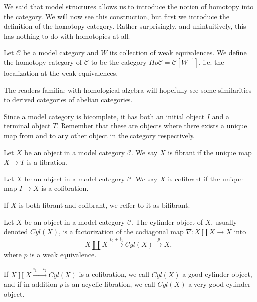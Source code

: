 We said that model structures allows us to introduce the notion of homotopy into the category. We will now see this construction, but first we introduce the definition of the homotopy category. Rather surprisingly, and unintuitively, this has nothing to do with homotopies at all. 

\begin{definition}
Let $\mathcal{C}$ be a model category and $W$ its collection of weak equivalences. We define the homotopy category of $\mathcal{C}$ to be the category $Ho\mathcal{C} = \mathcal{C}[W^{-1}]$, i.e. the localization at the weak equivalences. 
\end{definition}

\begin{remark}
The readers familiar with homological algebra will hopefully see some similarities to derived categories of abelian categories. 
\end{remark}

Since a model category is bicomplete, it has both an initial object $I$ and a terminal object $T$. Remember that these are objects where there exists a unique map from and to any other object in the category respectively. 

\begin{definition}
Let $X$ be an object in a model category $\mathcal{C}$. We say $X$ is fibrant if the unique map $X\longrightarrow T$ is a fibration. 
\end{definition}

\begin{definition}
Let $X$ be an object in a model category $\mathcal{C}$. We say $X$ is cofibrant if the unique map $I\longrightarrow X$ is a cofibration. 
\end{definition}

If $X$ is both fibrant and cofibrant, we reffer to it as bifibrant. 



\begin{definition}
Let $X$ be an object in a model category $\mathcal{C}$. The cylinder object of $X$, usually denoted $Cyl(X)$, is a factorization of the codiagonal map $\nabla: X\coprod X\longrightarrow X$ into
\begin{equation*}
    X\coprod X\overset{i_0+i_1}\longrightarrow Cyl(X) \overset{p}\longrightarrow X,
\end{equation*} 
where $p$ is a weak equivalence. 

If $X\coprod X\overset{i_1 + i_2}\rightarrow Cyl(X)$ is a cofibration, we call $Cyl(X)$ a good cylinder object, and if in addition $p$ is an acyclic fibration, we call $Cyl(X)$ a very good cylinder object.
\end{definition}

